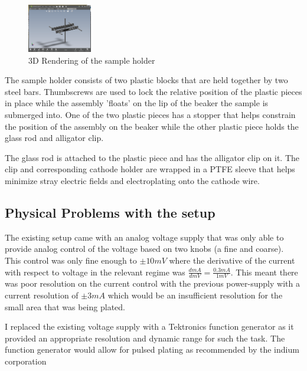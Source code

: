 \begin{figure}
    \centering
    \includegraphics[width=0.25\textwidth]{Main/Ch1/Sample_holder.png}
    \caption{3D Rendering of the sample holder}
\end{figure}

The sample holder consists of two plastic blocks that are held together by two steel bars. Thumbscrews are used to lock the relative position of the plastic pieces in place while the assembly 'floats'  on the lip of the beaker the sample is submerged into. One of the two plastic pieces has a stopper that helps constrain the position of the assembly on the beaker while the other plastic piece holds the glass rod and alligator clip.

The glass rod is attached to the plastic piece and has the alligator clip on it. The clip and corresponding cathode holder are wrapped in a PTFE sleeve that helps minimize stray electric fields and electroplating onto the cathode wire.



\subsection{Physical Problems with the setup}

The existing setup came with an analog voltage supply that was only able to provide analog control of the voltage based on two knobs (a fine and coarse). This control was only fine enough to $\pm 10mV$ where the derivative of the current with respect to voltage in the relevant regime was $\frac{d mA}{d mV} = \frac{0.3 mA}{1 mV}$.
This meant there was poor resolution on the current control with the previous power-supply with a current resolution of $\pm 3 mA$ which would be an insufficient resolution for the small area that was being plated.

I replaced the existing voltage supply with a Tektronics function generator as it provided an appropriate resolution and dynamic range for such the task.
The function generator would allow for pulsed plating as recommended by the indium corporation \cite{indiumCorpGrainStructure}

